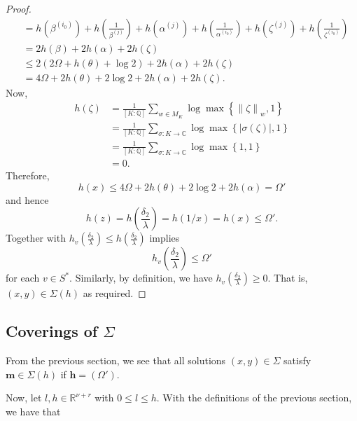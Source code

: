 \begin{proof}
\begin{align*}
	& = h(\beta^{(i_0)}) + h\left( \frac{1}{\beta^{(j)}}\right) + h(\alpha^{(j)}) + h\left( \frac{1}{\alpha^{(i_0)}}\right)+ h(\zeta^{(j)}) + h\left( \frac{1}{\zeta^{(i_0)}}\right)\\
	& = 2h(\beta) + 2h(\alpha) + 2h(\zeta)\\
	& \leq 2(2\Omega + h(\theta) + \log{2}) +2h(\alpha) + 2h(\zeta)\\
	& = 4\Omega + 2h(\theta) + 2\log{2} + 2h(\alpha) + 2h(\zeta).
\end{align*}
Now, 
\begin{align*}
h(\zeta)	& =\frac{1}{[K:\mathbb{Q}]}\sum_{w \in M_K} \log \max \left\{ \left\|\zeta\right\|_{w}, 1\right\}\\
		& = \frac{1}{[K:\mathbb{Q}]}\sum_{\sigma:K \to \mathbb{C}} \log \max \left\{ |\sigma(\zeta)|, 1\right\}\\
		& = \frac{1}{[K:\mathbb{Q}]}\sum_{\sigma:K \to \mathbb{C}} \log \max \left\{ 1, 1\right\}\\
		& = 0.
\end{align*}
Therefore, 
\[h(x) \leq 4\Omega + 2h(\theta) + 2\log{2} + 2h(\alpha) = \Omega'\]
and hence
\[h(z) = h\left(\frac{\delta_2}{\lambda}\right) = h(1/x) = h(x) \leq \Omega'.\]
Together with $\displaystyle h_v\left(\frac{\delta_2}{\lambda}\right) \leq h\left(\frac{\delta_2}{\lambda}\right)$ implies
\[h_v\left(\frac{\delta_2}{\lambda}\right) \leq \Omega'\]
for each $v \in S^*.$
Similarly, by definition, we have $h_v\left(\frac{\delta_2}{\lambda}\right) \geq 0$. That is, $(x,y) \in \Sigma(h)$ as required. 
\end{proof}

\subsection{Coverings of $\Sigma$}

From the previous section, we see that all solutions $(x,y) \in \Sigma$ satisfy $\mathbf{m}\in \Sigma(h)$ if ${\mathbf{h} = (\Omega')}$.

Now, let $l,h\in\mathbb{R}^{\nu+r}$ with $0\leq l\leq h$. With the definitions of the previous section, we have that


